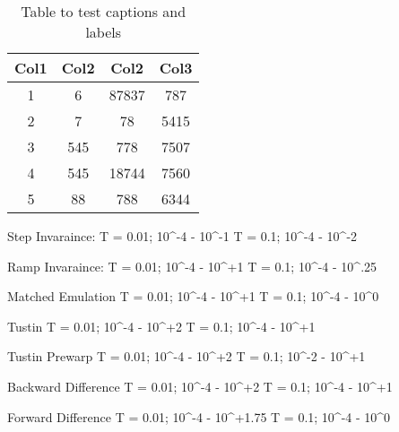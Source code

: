 \begin{table}[h!]
\centering
\begin{tabular}{||c c c c||} 
 \hline
 Col1 & Col2 & Col2 & Col3 \\ [0.5ex] 
 \hline\hline
 1 & 6 & 87837 & 787 \\ 
 2 & 7 & 78 & 5415 \\
 3 & 545 & 778 & 7507 \\
 4 & 545 & 18744 & 7560 \\
 5 & 88 & 788 & 6344 \\ [1ex] 
 \hline
\end{tabular}
\caption{Table to test captions and labels}
\label{table:1}
\end{table}


Step Invaraince:
T = 0.01; 10^-4 - 10^-1
T = 0.1;  10^-4 - 10^-2

Ramp Invaraince: 
T = 0.01; 10^-4 - 10^+1
T = 0.1;  10^-4 - 10^.25

Matched Emulation
T = 0.01; 10^-4 - 10^+1
T = 0.1;  10^-4 - 10^0

Tustin
T = 0.01; 10^-4 - 10^+2
T = 0.1;  10^-4 - 10^+1

Tustin Prewarp
T = 0.01; 10^-4 - 10^+2
T = 0.1;  10^-2 - 10^+1

Backward Difference
T = 0.01; 10^-4 - 10^+2
T = 0.1;  10^-4 - 10^+1

Forward Difference
T = 0.01; 10^-4 - 10^+1.75
T = 0.1;  10^-4 - 10^0